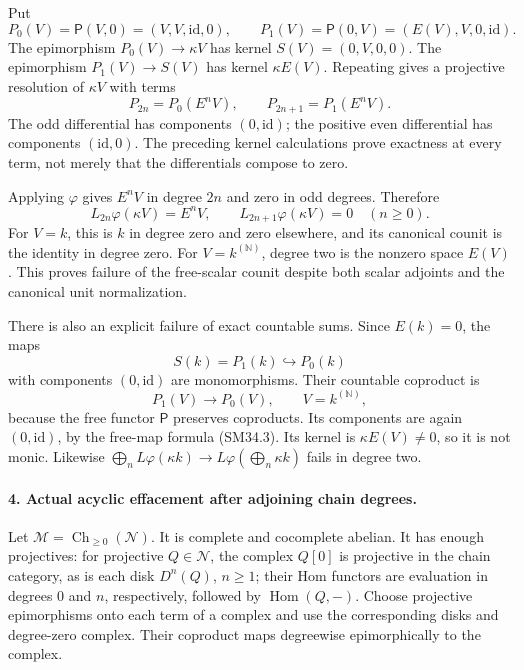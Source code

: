 Put
\[
 P_0(V)=\mathsf P(V,0)=(V,V,\mathrm{id},0),\qquad
 P_1(V)=\mathsf P(0,V)=(E(V),V,0,\mathrm{id}).                \tag{SM34.6}
\]
The epimorphism \(P_0(V)\to\kappa V\) has kernel
\(S(V)=(0,V,0,0)\).  The epimorphism
\(P_1(V)\to S(V)\) has kernel \(\kappa E(V)\).
Repeating gives a projective resolution of \(\kappa V\)
with terms
\[
       P_{2n}=P_0(E^nV),\qquad P_{2n+1}=P_1(E^nV).
                                                               \tag{SM34.7}
\]
The odd differential has components \((0,\mathrm{id})\);
the positive even differential has components
\((\mathrm{id},0)\).  The preceding kernel calculations
prove exactness at every term, not merely that the
differentials compose to zero.

Applying \(\varphi\) gives \(E^nV\) in degree \(2n\)
and zero in odd degrees.  Therefore
\[
 L_{2n}\varphi(\kappa V)=E^nV,\qquad
 L_{2n+1}\varphi(\kappa V)=0\quad(n\ge0).                    \tag{SM34.8}
\]
For \(V=k\), this is \(k\) in degree zero and zero
elsewhere, and its canonical counit is the identity in
degree zero.  For \(V=k^{(\mathbb N)}\), degree two is
the nonzero space \(E(V)\).  This proves failure of the
free-scalar counit despite both scalar adjoints and the
canonical unit normalization.

There is also an explicit failure of exact countable sums.
Since \(E(k)=0\), the maps
\[
                S(k)=P_1(k)\hookrightarrow P_0(k)
\]
with components \((0,\mathrm{id})\) are monomorphisms.
Their countable coproduct is
\[
                    P_1(V)\longrightarrow P_0(V),
                        \qquad V=k^{(\mathbb N)},            \tag{SM34.9}
\]
because the free functor \(\mathsf P\) preserves
coproducts.  Its components are again
\((0,\mathrm{id})\), by the free-map formula (SM34.3).
Its kernel is \(\kappa E(V)\ne0\), so it is not monic.
Likewise \(\bigoplus_nL\varphi(\kappa k)\to
L\varphi(\bigoplus_n\kappa k)\) fails in degree two.

\paragraph{4. Actual acyclic effacement after adjoining chain degrees.}
Let \(\mathcal M=\operatorname{Ch}_{\ge0}(\mathcal N)\).
It is complete and cocomplete abelian.  It has enough
projectives: for projective \(Q\in\mathcal N\), the
complex \(Q[0]\) is projective in the chain category, as
is each disk \(D^n(Q)\), \(n\ge1\); their Hom functors
are evaluation in degrees \(0\) and \(n\), respectively,
followed by \(\operatorname{Hom}(Q,-)\).  Choose projective
epimorphisms onto each term of a complex and use the
corresponding disks and degree-zero complex.  Their
coproduct maps degreewise epimorphically to the complex.

